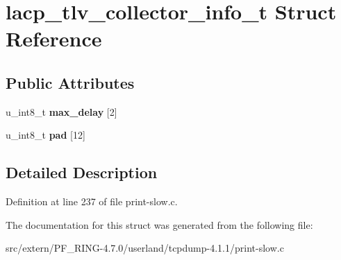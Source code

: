 \hypertarget{structlacp__tlv__collector__info__t}{
\section{lacp\_\-tlv\_\-collector\_\-info\_\-t Struct Reference}
\label{structlacp__tlv__collector__info__t}
}
\subsection*{Public Attributes}
\begin{DoxyCompactItemize}
\item 
\hypertarget{structlacp__tlv__collector__info__t_ad375781bd1d2bbd8fc8e17766d7995ea}{
u\_\-int8\_\-t {\bfseries max\_\-delay} \mbox{[}2\mbox{]}}
\label{structlacp__tlv__collector__info__t_ad375781bd1d2bbd8fc8e17766d7995ea}

\item 
\hypertarget{structlacp__tlv__collector__info__t_a45876193f26650b6e1b729d37e4d5024}{
u\_\-int8\_\-t {\bfseries pad} \mbox{[}12\mbox{]}}
\label{structlacp__tlv__collector__info__t_a45876193f26650b6e1b729d37e4d5024}

\end{DoxyCompactItemize}


\subsection{Detailed Description}


Definition at line 237 of file print-\/slow.c.



The documentation for this struct was generated from the following file:\begin{DoxyCompactItemize}
\item 
src/extern/PF\_\-RING-\/4.7.0/userland/tcpdump-\/4.1.1/print-\/slow.c\end{DoxyCompactItemize}
